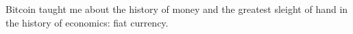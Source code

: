 Bitcoin taught me about the history of money and the greatest sleight of
hand in the history of economics: fiat currency.

%
%
%
%
